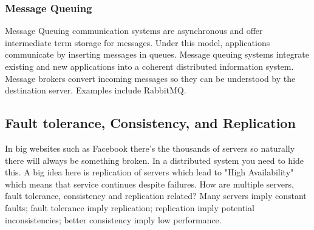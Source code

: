 \documentclass[10pt]{article}
\begin{document}
\subsubsection{Message Queuing}
Message Queuing communication systems are asynchronous and offer intermediate term storage for messages. Under this model, applications communicate by inserting messages in queues. Message queuing systems integrate existing and new applications into a coherent distributed information system. Message brokers convert incoming messages so they can be understood by the destination server. Examples include RabbitMQ.

\subsection{Fault tolerance, Consistency, and Replication}
In big websites such as Facebook there's the thousands of servers so naturally there will always be something broken. In a distributed system you need to hide this. A big idea here is replication of servers which lead to "High Availability" which means that service continues despite failures. How are multiple servers, fault tolerance, consistency and replication related? Many servers imply constant faults; fault tolerance imply replication; replication imply potential inconsistencies; better consistency imply low performance.
\end{document}
